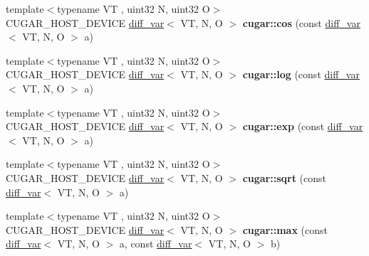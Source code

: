 \begin{DoxyCompactItemize}
{\footnotesize template$<$typename VT , uint32 N, uint32 O$>$ }\\C\+U\+G\+A\+R\+\_\+\+H\+O\+S\+T\+\_\+\+D\+E\+V\+I\+CE \hyperlink{structcugar_1_1diff__var}{diff\+\_\+var}$<$ VT, N, O $>$ {\bfseries cugar\+::cos} (const \hyperlink{structcugar_1_1diff__var}{diff\+\_\+var}$<$ VT, N, O $>$ a)
\item 
\mbox{\label{group___auto_diff_module_gaf730762e330e9658b4d20e6815e993e7}} 
{\footnotesize template$<$typename VT , uint32 N, uint32 O$>$ }\\C\+U\+G\+A\+R\+\_\+\+H\+O\+S\+T\+\_\+\+D\+E\+V\+I\+CE \hyperlink{structcugar_1_1diff__var}{diff\+\_\+var}$<$ VT, N, O $>$ {\bfseries cugar\+::log} (const \hyperlink{structcugar_1_1diff__var}{diff\+\_\+var}$<$ VT, N, O $>$ a)
\item 
\mbox{\label{group___auto_diff_module_ga0f559fc5bcfcdc48e912bdc040463b6b}} 
{\footnotesize template$<$typename VT , uint32 N, uint32 O$>$ }\\C\+U\+G\+A\+R\+\_\+\+H\+O\+S\+T\+\_\+\+D\+E\+V\+I\+CE \hyperlink{structcugar_1_1diff__var}{diff\+\_\+var}$<$ VT, N, O $>$ {\bfseries cugar\+::exp} (const \hyperlink{structcugar_1_1diff__var}{diff\+\_\+var}$<$ VT, N, O $>$ a)
\item 
\mbox{\label{group___auto_diff_module_ga8c0a102a3026cbf0f90cf626b8ed26a2}} 
{\footnotesize template$<$typename VT , uint32 N, uint32 O$>$ }\\C\+U\+G\+A\+R\+\_\+\+H\+O\+S\+T\+\_\+\+D\+E\+V\+I\+CE \hyperlink{structcugar_1_1diff__var}{diff\+\_\+var}$<$ VT, N, O $>$ {\bfseries cugar\+::sqrt} (const \hyperlink{structcugar_1_1diff__var}{diff\+\_\+var}$<$ VT, N, O $>$ a)
\item 
\mbox{\label{group___auto_diff_module_ga421d5390f721a4c0b1b1d97a96287512}} 
{\footnotesize template$<$typename VT , uint32 N, uint32 O$>$ }\\C\+U\+G\+A\+R\+\_\+\+H\+O\+S\+T\+\_\+\+D\+E\+V\+I\+CE \hyperlink{structcugar_1_1diff__var}{diff\+\_\+var}$<$ VT, N, O $>$ {\bfseries cugar\+::max} (const \hyperlink{structcugar_1_1diff__var}{diff\+\_\+var}$<$ VT, N, O $>$ a, const \hyperlink{structcugar_1_1diff__var}{diff\+\_\+var}$<$ VT, N, O $>$ b)
\item 
\mbox{\label{group___auto_diff_module_gace1cb842028cd5c08bc19a3980d4befa}} 

\end{DoxyCompactItemize}
